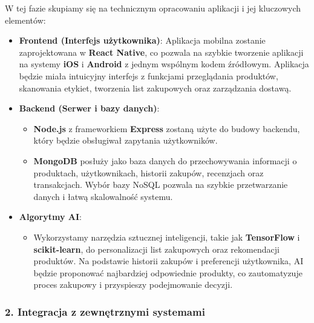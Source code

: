 \documentclass[12pt,a4paper]{article}
\begin{document}
W tej fazie skupiamy się na technicznym opracowaniu aplikacji i jej kluczowych elementów:
\begin{itemize}
    \item \textbf{Frontend (Interfejs użytkownika)}: Aplikacja mobilna zostanie zaprojektowana w
        \textbf{React Native}, co pozwala na szybkie tworzenie aplikacji na systemy \textbf{iOS} i
        \textbf{Android} z jednym wspólnym kodem źródłowym.
        Aplikacja będzie miała intuicyjny interfejs z funkcjami przeglądania produktów,
        skanowania etykiet, tworzenia list zakupowych oraz zarządzania dostawą.
    \item \textbf{Backend (Serwer i bazy danych)}:
    \begin{itemize}
        \item \textbf{Node.js} z frameworkiem \textbf{Express} zostaną użyte do budowy backendu,
            który będzie obsługiwał zapytania użytkowników.
        \item \textbf{MongoDB} posłuży jako baza danych do przechowywania informacji o produktach,
            użytkownikach, historii zakupów, recenzjach oraz transakcjach. Wybór bazy NoSQL pozwala
            na szybkie przetwarzanie danych i łatwą skalowalność systemu.
    \end{itemize}
    \item \textbf{Algorytmy AI}:
    \begin{itemize}
        \item Wykorzystamy narzędzia sztucznej inteligencji, takie jak \textbf{TensorFlow} i
            \textbf{scikit-learn}, do personalizacji list zakupowych oraz rekomendacji produktów.
            Na podstawie historii zakupów i preferencji użytkownika, AI będzie proponować
            najbardziej odpowiednie produkty, co zautomatyzuje proces zakupowy i przyspieszy
            podejmowanie decyzji.
    \end{itemize}
\end{itemize}

\subsubsection*{2. Integracja z zewnętrznymi systemami}
\end{document}
